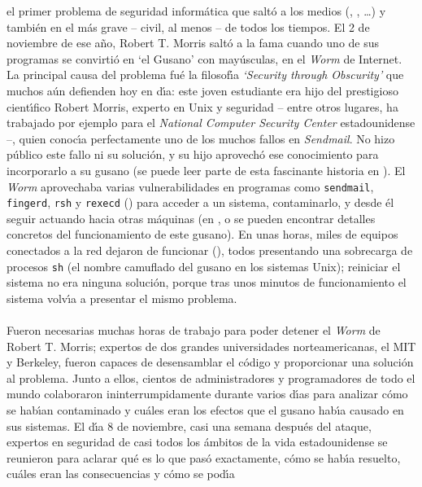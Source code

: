 el primer problema de seguridad inform\'atica que salt\'o a los medios 
(\cite{kn:mar88a}, \cite{kn:mar88b}, \cite{kn:roy88}\ldots) y 
tambi\'en en el m\'as grave -- civil, al menos -- de todos los tiempos. El 2
de noviembre de ese a\~no, Robert T. Morris salt\'o a la fama cuando uno de
sus programas se convirti\'o en `el Gusano' con may\'usculas, en el {\it Worm}
de Internet. La principal causa del problema fu\'e la filosof\'{\i}a {\it 
`Security through Obscurity'} que muchos a\'un defienden hoy en d\'{\i}a: este
joven estudiante era hijo del prestigioso cient\'{\i}fico Robert Morris, experto
en Unix y seguridad -- entre otros lugares, ha trabajado por ejemplo
para el {\it National Computer Security Center} estadounidense --, quien 
conoc\'{\i}a perfectamente uno de los muchos fallos en {\it Sendmail}. No
hizo p\'ublico este fallo ni su soluci\'on, y su hijo aprovech\'o ese 
conocimiento para incorporarlo a su gusano (se puede leer parte de esta 
fascinante historia en \cite{kn:sto89}). El {\it Worm} aprovechaba varias 
vulnerabilidades en programas como {\tt sendmail}, {\tt fingerd}, {\tt rsh} y
{\tt rexecd} (\cite{kn:see89}) para acceder a un sistema, contaminarlo, y 
desde \'el seguir actuando hacia otras m\'aquinas (en \cite{kn:spa88}, 
\cite{kn:er89} o \cite{kn:spa91} se pueden encontrar detalles concretos del
funcionamiento de este gusano). En unas horas, miles de equipos conectados a la
red dejaron de funcionar (\cite{kn:spa89}), todos presentando una sobrecarga
de procesos {\tt sh} (el nombre camuflado del gusano en los sistemas Unix); 
reiniciar el sistema no era ninguna soluci\'on, porque tras unos minutos de
funcionamiento el sistema volv\'{\i}a a presentar el mismo problema.\\
\\Fueron necesarias muchas horas de trabajo para poder detener el {\it Worm}
de Robert T. Morris; expertos de dos grandes universidades norteamericanas,
el MIT y Berkeley, fueron capaces de desensamblar el c\'odigo y proporcionar
una soluci\'on al problema. Junto a ellos, cientos de administradores y 
programadores de todo el mundo colaboraron ininterrumpidamente durante varios 
d\'{\i}as para analizar c\'omo se hab\'{\i}an contaminado y cu\'ales eran los 
efectos que el gusano hab\'{\i}a causado en sus 
sistemas. El d\'{\i}a 8 de noviembre, casi una semana despu\'es del ataque,
expertos en seguridad de casi todos los \'ambitos de la vida estadounidense
se reunieron para aclarar qu\'e es lo que pas\'o exactamente, c\'omo se 
hab\'{\i}a resuelto, cu\'ales eran las consecuencias y c\'omo se pod\'{\i}a
